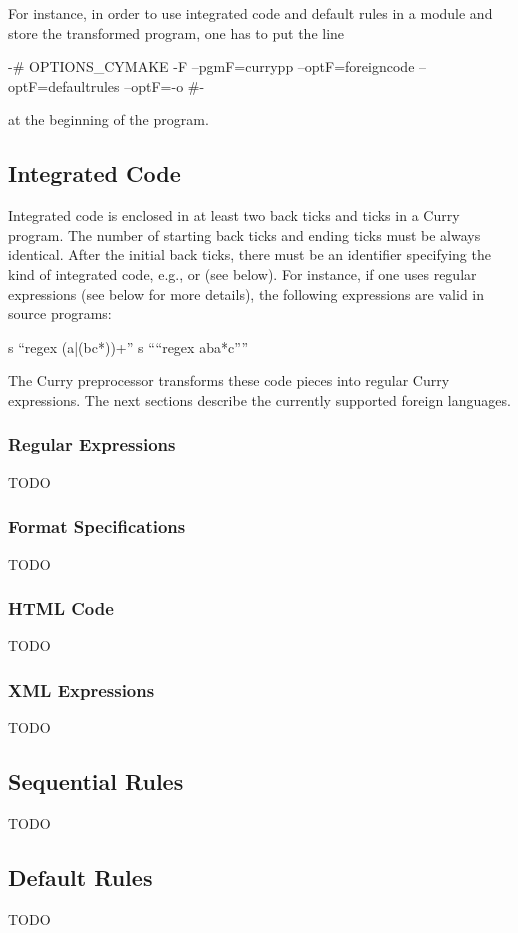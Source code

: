 For instance, in order to use integrated code and default rules
in a module and store the transformed program,
one has to put the line
\begin{curry}
{-# OPTIONS_CYMAKE -F --pgmF=currypp --optF=foreigncode --optF=defaultrules --optF=-o #-}
\end{curry}
at the beginning of the program.


\subsection{Integrated Code}

Integrated code is enclosed in at least two back ticks and ticks
in a Curry program. The number of starting back ticks and ending ticks
must be always identical.
After the initial back ticks, there must be an identifier
specifying the kind of integrated code,
e.g.,  or  (see below).
For instance, if one uses regular expressions (see below for more details),
the following expressions are valid in source programs:
\begin{curry}
  s ``regex (a|(bc*))+''
  s ````regex aba*c''''
\end{curry}
The Curry preprocessor transforms these code pieces into regular
Curry expressions. The next sections describe the currently
supported foreign languages.


\subsubsection{Regular Expressions}

TODO

\subsubsection{Format Specifications}

TODO

\subsubsection{HTML Code}

TODO

\subsubsection{XML Expressions}

TODO

\subsection{Sequential Rules}

TODO

\subsection{Default Rules}

TODO

